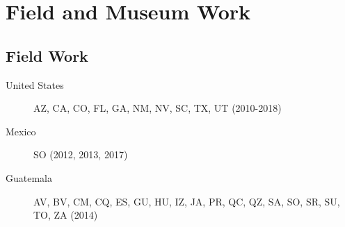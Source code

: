 \documentclass[12pt,a4paper]{article}
\begin{document}
\section*{Field and Museum Work}

	\subsection*{Field Work}
		\begin{description}
			\item [United States] \tabto*{3cm} AZ, CA, CO, FL, GA, NM, NV, SC, TX, UT (2010-2018)
			\item [Mexico] \tabto*{3cm} SO (2012, 2013, 2017)
			\item [Guatemala] \tabto*{3cm} AV, BV, CM, CQ, ES, GU, HU, IZ, JA, PR, QC, QZ, SA, SO, SR, SU, TO, ZA (2014)
		\end{description}
\end{document}
